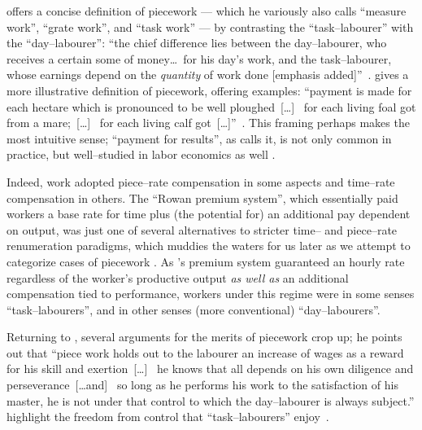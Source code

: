 \documentclass[trackingWork]{subfiles}
\begin{document}
\citeauthor{hughRaynbirdTaskWork} offers
a concise definition of piecework
--- which he variously also calls ``measure work'', ``grate work'', and ``task work'' ---
by contrasting the ``task--labourer'' with the ``day--labourer'':
``the chief difference lies between the day--labourer,
who receives a certain some of money\dots~for his day's work,
and the task--labourer, whose earnings depend on the \textit{quantity} of work done [emphasis added]''~\cite{hughRaynbirdTaskWork}.
\citeauthor{10.2307/2338394} gives a more illustrative definition of piecework,
offering examples:
``payment is made for each hectare which is pronounced to be well ploughed~[\dots]~
for each living foal got from a mare;~[\dots]~
for each living calf got~[\dots]''~\cite{10.2307/2338394}.
This framing perhaps makes the most intuitive sense;
``payment for results'', as \citeauthor{10.2307/2338394} calls it,
is not only common in practice, but well--studied in labor economics as well
\cite{Figlio2007901,weitzman1976new,10.2307/3003414,BJIR:BJIR038}.

Indeed, work adopted piece--rate compensation in some aspects and
time--rate compensation in others.
The ``Rowan premium system'',
which essentially paid workers
a base rate for time plus
(the potential for) an additional pay dependent on output,
was just one of several alternatives to stricter time-- and piece--rate renumeration paradigms, which
muddies the waters for us later as we attempt to categorize cases of piecework
\cite{rowan1901premium}.
As \citeauthor{rowan1901premium}'s premium system guaranteed an hourly rate
regardless of the worker's productive output
\textit{as well as} an additional compensation tied to performance,
workers under this regime were in some senses ``task--labourers'',
and in other senses
(more conventional)
``day--labourers''.

Returning to
\citeauthor{hughRaynbirdTaskWork}, several arguments for the merits of piecework
crop up; he points out that 
``piece work holds out to the labourer an increase of wages as a reward for his skill and exertion~[\dots]~
he knows that all depends on his own diligence and perseverance~[\dots and]~
so long as he performs his work to the satisfaction of his master,
he is not under that control to which the day--labourer is always subject.''
\citeauthor{hughRaynbirdTaskWork} highlight the freedom from control that ``task--labourers'' enjoy~\cite{hughRaynbirdTaskWork,rowan1901premium}.
\end{document}
